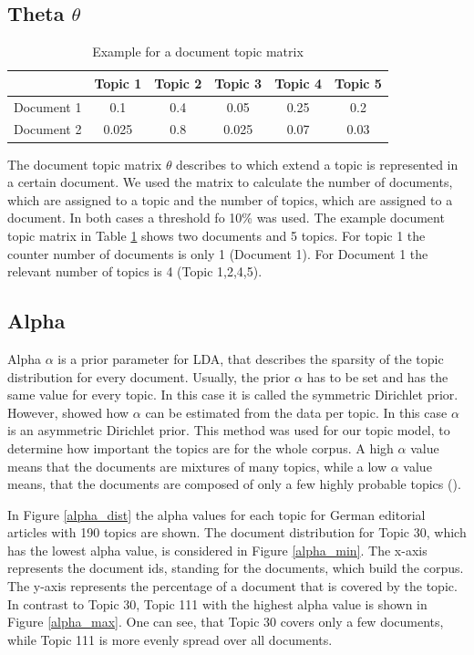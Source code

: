 \subsection{Theta $\theta$}
\begin{table}[h]
	\centering
	\begin{tabular}{c|ccccc}
		&Topic 1&Topic 2&Topic 3&Topic 4&Topic 5\\
		\hline
		Document 1&0.1 & 0.4 & 0.05 & 0.25 & 0.2  \\
		Document 2&0.025&0.8 & 0.025 & 0.07 & 0.03\\
	\end{tabular}
	\caption[Document topic matrix]{Example for a document topic matrix}
	\label{doc_topic}
\end{table}
The document topic matrix $\theta$ describes to which extend a topic is represented in a certain document.
We used the matrix to calculate the number of documents, which are assigned to a topic and the number of topics, which are assigned to a document. In both cases a threshold fo 10\% was used. The example document topic matrix in Table \ref{doc_topic} shows two documents and 5 topics. For topic 1 the counter number of documents is only 1 (Document 1). For Document 1 the relevant number of topics is 4 (Topic 1,2,4,5). 

\subsection{Alpha}
Alpha $\alpha$ is a prior parameter for \ac{LDA}, that describes the sparsity of the topic distribution for every document. Usually, the prior $\alpha$ has to be set and has the same value for every topic. In this case it is called the symmetric Dirichlet prior. However, \cite{Blei2003} showed how $\alpha$ can be estimated from the data per topic. In this case $\alpha$ is an asymmetric Dirichlet prior. This method was used for our topic model, to determine how important the topics are for the whole corpus. A high $\alpha$ value means that the documents are mixtures of many topics, while a low $\alpha$ value means, that the documents are composed of only a few highly probable topics (\cite{Steyvers2007}).

In Figure \ref{alpha_dist} the alpha values for each topic for German editorial articles with 190 topics are shown. The document distribution for Topic 30, which has the lowest alpha value, is considered in Figure \ref{alpha_min}. The x-axis represents the document ids, standing for the documents, which build the corpus. The y-axis represents the percentage of a document that is covered by the topic. In contrast to Topic 30, Topic 111 with the highest alpha value is shown in Figure \ref{alpha_max}. One can see, that Topic 30 covers only a few documents, while Topic 111 is more evenly spread over all documents.

